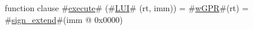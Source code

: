 function clause #\hyperref[zexecute]{execute}# (#\hyperref[zLUI]{LUI}# (rt, imm)) =
  {
    #\hyperref[zwGPR]{wGPR}#(rt) = #\hyperref[zsignzyextend]{sign\_extend}#(imm @ 0x0000)
  }
